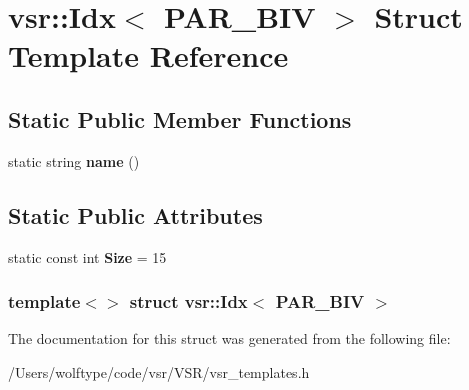 \hypertarget{structvsr_1_1_idx_3_01_p_a_r___b_i_v_01_4}{\section{vsr\-:\-:Idx$<$ P\-A\-R\-\_\-\-B\-I\-V $>$ Struct Template Reference}
\label{structvsr_1_1_idx_3_01_p_a_r___b_i_v_01_4}
}
\subsection*{Static Public Member Functions}
\begin{DoxyCompactItemize}
\item 
\hypertarget{structvsr_1_1_idx_3_01_p_a_r___b_i_v_01_4_a6be70e08f64cfdf86f007cdd5732385f}{static string {\bfseries name} ()}\label{structvsr_1_1_idx_3_01_p_a_r___b_i_v_01_4_a6be70e08f64cfdf86f007cdd5732385f}

\end{DoxyCompactItemize}
\subsection*{Static Public Attributes}
\begin{DoxyCompactItemize}
\item 
\hypertarget{structvsr_1_1_idx_3_01_p_a_r___b_i_v_01_4_ac28372683ca24b25907455befc2afab2}{static const int {\bfseries Size} = 15}\label{structvsr_1_1_idx_3_01_p_a_r___b_i_v_01_4_ac28372683ca24b25907455befc2afab2}

\end{DoxyCompactItemize}
\subsubsection*{template$<$$>$ struct vsr\-::\-Idx$<$ P\-A\-R\-\_\-\-B\-I\-V $>$}



The documentation for this struct was generated from the following file\-:\begin{DoxyCompactItemize}
\item 
/\-Users/wolftype/code/vsr/\-V\-S\-R/vsr\-\_\-templates.\-h\end{DoxyCompactItemize}
